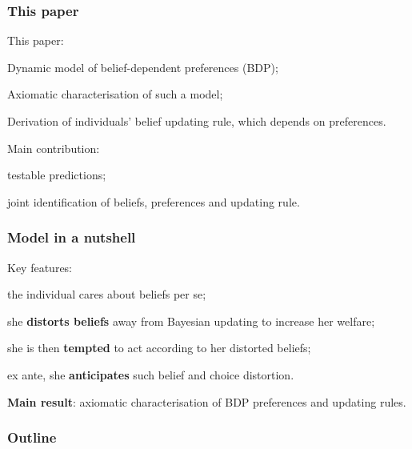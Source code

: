 \documentclass[usenames,dvipsnames,aspectratio=169,11pt,handout]{beamer}
\begin{document}
\begin{frame}\frametitle{This paper}
	This paper:

	\vfill

	\begin{wideenumerate}
		\item Dynamic model of belief-dependent preferences (BDP);
		\item Axiomatic characterisation of such a model;
		\item Derivation of individuals' belief updating rule, which depends on preferences.
	\end{wideenumerate} \pause

	\vfill

	Main contribution:
	\vfill
	\begin{wideitemize}
		\item testable predictions;
		\item joint identification of beliefs, preferences and updating rule.
	\end{wideitemize}

\end{frame}

\begin{frame}\frametitle{Model in a nutshell}

	Key features:

	\vfill

	\begin{wideitemize}
		\item the individual cares about beliefs per se;
		\item she \textbf{distorts beliefs} away from Bayesian updating to increase her welfare;
		\item she is then \textbf{tempted} to act according to her distorted beliefs;
		\item ex ante, she \textbf{anticipates} such belief and choice distortion. \footnotesize{\citep{cobb-clarkPredictivePowerSelfcontrol2022}}
	\end{wideitemize}

	\vfill \pause

	\textbf{Main result}: axiomatic characterisation of BDP preferences and updating rules.

\end{frame}

\begin{frame}\frametitle{Outline}

	\tableofcontents

\end{frame}
\end{document}

